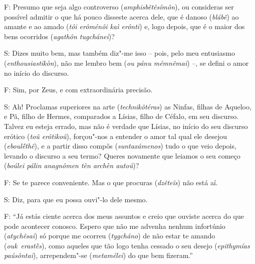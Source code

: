 F: Presumo que seja algo controverso (\emph{amphisbêtêsímôn}), ou
consideras ser possível admitir o que há pouco disseste acerca dele, que
é danoso (\emph{blábê}) ao amante e ao amado (\emph{tôi erôménôi kaì
erônti}) e, logo depois, que é o maior dos bens ocorridos (\emph{agathôn
tugchánei})?

 

\bekker{[263d]} S: Dizes muito bem, mas também diz"-me isso -- pois, pelo meu
entusiasmo (\emph{enthousiastikòn}), não me lembro bem (\emph{ou pánu
mémnêmai}) --, se defini o amor no início do discurso.

 

F: Sim, por Zeus, e com extraordinária precisão.

 

S: Ah! Proclamas superiores na arte (\emph{technikôtéras}) as Ninfas,
filhas de Aqueloo, e Pã, filho de Hermes, comparados a Lísias, filho de
Céfalo, em seu discurso. Talvez eu esteja errado, mas não é verdade que
Lísias, no início do seu discurso erótico (\emph{toû erôtikoû}),
forçou"-nos a entender o amor tal qual ele desejou (\emph{eboulḗthê}), e
a partir disso compôs (\emph{suntaxámenos}) tudo o que veio depois,
levando o discurso a seu termo? \bekker{[263e]} Queres novamente que leiamos
o seu começo (\emph{boúlei pálin anagnômen tèn archèn autoû})?

 

F: Se te parece conveniente. Mas o que procuras (\emph{dzêteîs}) não
está aí.

 

S: Diz, para que eu possa ouvi"-lo dele mesmo.

 

F: ``Já estás ciente acerca dos meus assuntos e creio que ouviste acerca
do que pode acontecer conosco. Espero que não me advenha nenhum
infortúnio (\emph{atychêsai}) só porque me ocorreu (\emph{tygcháno}) de
não estar te amando (\emph{ouk}~\emph{erastḕs}), \bekker{[264a]}como aqueles
que tão logo tenha cessado o seu desejo (\emph{epithymías paúsôntai}),
arrependem"-se (\emph{metamélei}) do que bem fizeram.''

